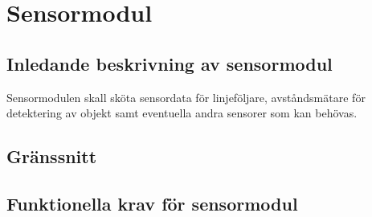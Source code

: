 \section{Sensormodul}
\subsection{Inledande beskrivning av sensormodul}
Sensormodulen skall sköta sensordata för linjeföljare, avståndsmätare för detektering av objekt samt eventuella andra sensorer som kan behövas.

\subsection{Gränssnitt}
\begin{LIPSkravlista}
\end{LIPSkravlista}

\subsection{Funktionella krav för sensormodul}
\begin{LIPSkravlista}
\addtocounter{LIPSkravnummer}{1} %
\end{LIPSkravlista}
